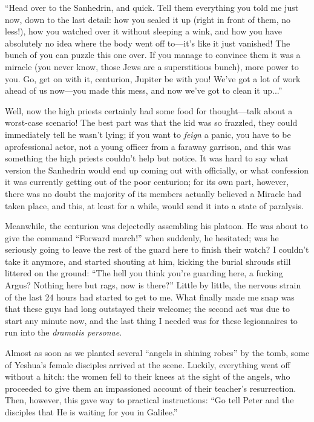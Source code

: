 ``Head over to the Sanhedrin, and quick. Tell them everything you told me just now, down to the last detail: how you sealed it up (right in front of them, no less!), how you watched over it without sleeping a wink, and how you have absolutely no idea where the body went off to---it's like it just vanished! The bunch of you can puzzle this one over. If you manage to convince them it was a miracle (you never know, those Jews are a superstitious bunch), more power to you. Go, get on with it, centurion, Jupiter be with you! We've got a lot of work ahead of us now---you made this mess, and now we've got to clean it up...''

Well, now the high priests certainly had some food for thought---talk about a worst-case scenario! The best part was that the kid was so frazzled, they could immediately tell he wasn't lying; if you want to \emph{feign} a panic, you have to be aprofessional actor, not a young officer from a faraway garrison, and this was something the high priests couldn't help but notice. It was hard to say what version the Sanhedrin would end up coming out with officially, or what confession it was currently getting out of the poor centurion; for its own part, however, there was no doubt the majority of its members actually believed a Miracle had taken place, and this, at least for a while, would send it into a state of paralysis.

Meanwhile, the centurion was dejectedly assembling his platoon. He was about to give the command ``Forward march!'' when suddenly, he hesitated; was he seriously going to leave the rest of the guard here to finish their watch? I couldn't take it anymore, and started shouting at him, kicking the burial shrouds still littered on the ground: ``The hell you think you're guarding here, a fucking Argus? Nothing here but rags, now is there?'' Little by little, the nervous strain of the last 24 hours had started to get to me. What finally made me snap was that these guys had long outstayed their welcome; the second act was due to start any minute now, and the last thing I needed was for these legionnaires to run into the \emph{dramatis personae}.

Almost as soon as we planted several ``angels in shining robes'' by the tomb, some of Yeshua's female disciples arrived at the scene. Luckily, everything went off without a hitch: the women fell to their knees at the sight of the angels, who proceeded to give them an impassioned account of their teacher's resurrection. Then, however, this gave way to practical instructions: ``Go tell Peter and the disciples that He is waiting for you in Galilee.''

